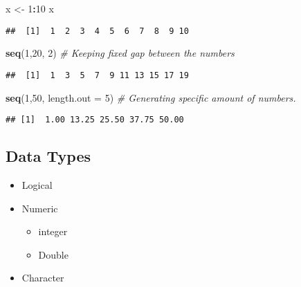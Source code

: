 \documentclass[
]{book}
\newenvironment{Shaded}{\begin{snugshade}}{\end{snugshade}}
\newcommand{\CommentTok}[1]{\textcolor[rgb]{0.56,0.35,0.01}{\textit{#1}}}
\newcommand{\DataTypeTok}[1]{\textcolor[rgb]{0.13,0.29,0.53}{#1}}
\newcommand{\DecValTok}[1]{\textcolor[rgb]{0.00,0.00,0.81}{#1}}
\newcommand{\KeywordTok}[1]{\textcolor[rgb]{0.13,0.29,0.53}{\textbf{#1}}}
\newcommand{\NormalTok}[1]{#1}
\newcommand{\OperatorTok}[1]{\textcolor[rgb]{0.81,0.36,0.00}{\textbf{#1}}}
\newcommand{\StringTok}[1]{\textcolor[rgb]{0.31,0.60,0.02}{#1}}
\providecommand{\tightlist}{%
  \setlength{\itemsep}{0pt}\setlength{\parskip}{0pt}}
\begin{document}
\begin{Shaded}
\begin{Highlighting}[]
\NormalTok{x <-}\StringTok{ }\DecValTok{1}\OperatorTok{:}\DecValTok{10}
\NormalTok{x}
\end{Highlighting}
\end{Shaded}

\begin{verbatim}
##  [1]  1  2  3  4  5  6  7  8  9 10
\end{verbatim}

\begin{Shaded}
\begin{Highlighting}[]
\KeywordTok{seq}\NormalTok{(}\DecValTok{1}\NormalTok{,}\DecValTok{20}\NormalTok{, }\DecValTok{2}\NormalTok{) }\CommentTok{# Keeping fixed gap between the numbers}
\end{Highlighting}
\end{Shaded}

\begin{verbatim}
##  [1]  1  3  5  7  9 11 13 15 17 19
\end{verbatim}

\begin{Shaded}
\begin{Highlighting}[]
\KeywordTok{seq}\NormalTok{(}\DecValTok{1}\NormalTok{,}\DecValTok{50}\NormalTok{, }\DataTypeTok{length.out =} \DecValTok{5}\NormalTok{) }\CommentTok{# Generating specific amount of numbers.}
\end{Highlighting}
\end{Shaded}

\begin{verbatim}
## [1]  1.00 13.25 25.50 37.75 50.00
\end{verbatim}

\hypertarget{data-types}{%
\subsection{Data Types}\label{data-types}}

\begin{itemize}
\tightlist
\item
  Logical
\item
  Numeric

  \begin{itemize}
  \tightlist
  \item
    integer
  \item
    Double
  \end{itemize}
\item
  Character
\end{itemize}
\end{document}

